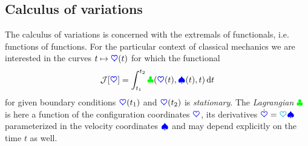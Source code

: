 \subsection{Calculus of variations}\label{sec:CalculusOfVariations}
The calculus of variations is concerned with the extremals of functionals, i.e. functions of functions. %
For the particular context of classical mechanics we are interested in the curves $t \mapsto \sysCoord(t)$ for which the functional
\begin{align}\label{eq:Functional}
 \mathcal{J}[\sysCoord] = \int_{t_1}^{t_2} \Lagrangian(\sysCoord(t), \sysVel(t), t) \, \d t
\end{align}
for given boundary conditions $\sysCoord(t_1)$ and $\sysCoord(t_2)$ is \textit{stationary}.
The \textit{Lagrangian} $\Lagrangian$ is here a function of the configuration coordinates $\sysCoord$, its derivatives $\sysCoordd = \kinMat \sysVel$ parameterized in the velocity coordinates $\sysVel$ and may depend explicitly on the time $t$ as well.

